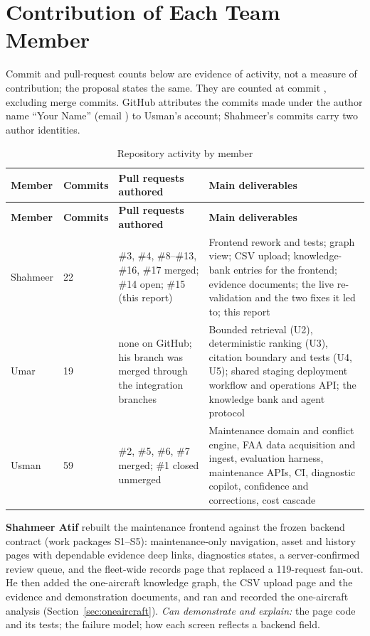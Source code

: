\section{Contribution of Each Team Member}\label{sec:contrib}
Commit and pull-request counts below are evidence of activity, not a measure of contribution; the proposal states the same. They are counted at commit , excluding merge commits. GitHub attributes the commits made under the author name ``Your Name'' (email ) to Usman's account; Shahmeer's commits carry two author identities.
\begin{longtable}{p{}p{}p{}p{}}
\caption{Repository activity by member}\label{tab:activity}\\
\toprule \textbf{Member} & \textbf{Commits} & \textbf{Pull requests authored} & \textbf{Main deliverables} \\ \midrule \endfirsthead
\toprule \textbf{Member} & \textbf{Commits} & \textbf{Pull requests authored} & \textbf{Main deliverables} \\ \midrule \endhead
Shahmeer & 22 & \#3, \#4, \#8--\#13, \#16, \#17 merged; \#14 open; \#15 (this report) & Frontend rework and tests; graph view; CSV upload; knowledge-bank entries for the frontend; evidence documents; the live re-validation and the two fixes it led to; this report \\
Umar & 19 & none on GitHub; his branch was merged through the integration branches & Bounded retrieval (U2), deterministic ranking (U3), citation boundary and tests (U4, U5); shared staging deployment workflow and operations API; the knowledge bank and agent protocol \\
Usman & 59 & \#2, \#5, \#6, \#7 merged; \#1 closed unmerged & Maintenance domain and conflict engine, FAA data acquisition and ingest, evaluation harness, maintenance APIs, CI, diagnostic copilot, confidence and corrections, cost cascade \\
\bottomrule
\end{longtable}

\textbf{Shahmeer Atif} rebuilt the maintenance frontend against the frozen backend contract (work packages S1--S5): maintenance-only navigation, asset and history pages with dependable evidence deep links, diagnostics states, a server-confirmed review queue, and the fleet-wide records page that replaced a 119-request fan-out. He then added the one-aircraft knowledge graph, the CSV upload page and the evidence and demonstration documents, and ran and recorded the one-aircraft analysis (Section~\ref{sec:oneaircraft}). \emph{Can demonstrate and explain:} the page code and its tests; the failure model; how each screen reflects a backend field.

